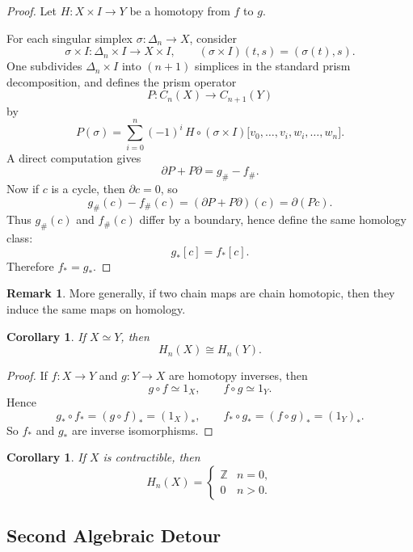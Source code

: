 \documentclass[11pt,a4paper]{article}
\theoremstyle{definition}
\newtheorem{remark}[definition]{Remark}
\theoremstyle{plain}
\newtheorem{corollary}[definition]{Corollary}
\theoremstyle{remark}
\newcommand{\1}{\mathbbm{1}}
\begin{document}
\begin{proof}
    Let $H\colon X\times I\to Y$ be a homotopy from $f$ to $g$.

    For each singular simplex $\sigma\colon \Delta_n\to X$, consider
    \[
    \sigma\times I \colon \Delta_n\times I \to X\times I, \qquad (\sigma\times I)(t,s)=(\sigma(t),s).
    \]
    One subdivides $\Delta_n\times I$ into $(n+1)$ simplices in the standard prism decomposition, and defines the prism operator
    \[
    P \colon C_n(X)\to C_{n+1}(Y)
    \]
    by
    \[
    P(\sigma)=\sum_{i=0}^n (-1)^i\, H\circ(\sigma\times I)\bigl[v_0,\dots,v_i,w_i,\dots,w_n\bigr].
    \]
    A direct computation gives
    \[
    \partial P + P\partial = g_\# - f_\#.
    \]
    Now if $c$ is a cycle, then $\partial c=0$, so
    \[
    g_\#(c)-f_\#(c)=(\partial P + P\partial)(c)=\partial(Pc).
    \]
    Thus $g_\#(c)$ and $f_\#(c)$ differ by a boundary, hence define the same homology class:
    \[
    g_*[c]=f_*[c].
    \]
    Therefore $f_*=g_*$.
\end{proof}

\begin{remark}
    More generally, if two chain maps are chain homotopic, then they induce the same maps on homology.
\end{remark}

\begin{corollary}
    If $X\simeq Y$, then
    \[
    H_n(X)\cong H_n(Y).
    \]
\end{corollary}

\begin{proof}
    If $f\colon X\to Y$ and $g\colon Y\to X$ are homotopy inverses, then
    \[
    g\circ f \simeq 1_X, \qquad f\circ g \simeq 1_Y.
    \]
    Hence
    \[
    g_*\circ f_*=(g\circ f)_*=(1_X)_*, \qquad f_*\circ g_*=(f\circ g)_*=(1_Y)_*.
    \]
    So $f_*$ and $g_*$ are inverse isomorphisms.
\end{proof}

\begin{corollary}
    If $X$ is contractible, then
    \[
    H_n(X)=
    \begin{cases}
        \mathbb{Z} & n=0,\\
        0 & n>0.
    \end{cases}
    \]
\end{corollary}

\subsection{Second Algebraic Detour}
\end{document}

